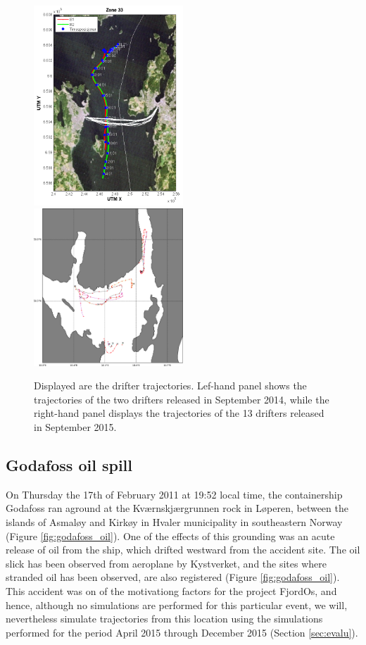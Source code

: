 \begin{figure}[ht]
\centerline{
\includegraphics*[width=0.5\textwidth]{Figurer/drifters_sept2014}
\includegraphics*[width=0.5\textwidth]{Figurer/drifters_low_crop}
}
\caption{\small
Displayed are the drifter trajectories. Lef-hand panel shows the trajectories of the two drifters released in September 2014, while the right-hand panel displays the trajectories of the 13 drifters released in September 2015.}
\label{fig:drifters_tracks}
\end{figure}

\subsection{Godafoss oil spill}
\label{sect:godafoss_obs}
On Thursday the 17th of February 2011 at 19:52 local time, the containership Godafoss ran aground at the Kv{\ae}rnskj{\ae}rgrunnen rock in L{\o}peren, between the islands of Asmal{\o}y and Kirk{\o}y in Hvaler municipality in southeastern Norway (Figure \ref{fig:godafoss_oil}). One of the effects of this grounding was an acute release of oil from the ship, which drifted westward from the accident site. The oil slick has been observed from aeroplane by Kystverket, and the sites where stranded oil has been observed, are also registered (Figure \ref{fig:godafoss_oil}). This accident was on of the motivationg factors for the project FjordOs, and hence, although no simulations are performed for this particular event, we will, nevertheless simulate trajectories from this location using the simulations performed for the period April 2015 through December 2015 (Section \ref{sec:evalu}). 

